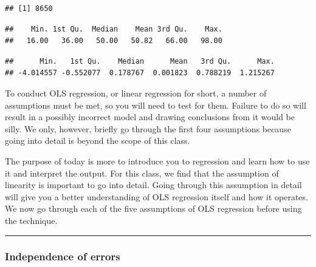 \documentclass[
]{book}
\newenvironment{Shaded}{\begin{snugshade}}{\end{snugshade}}
\newcommand{\CommentTok}[1]{\textcolor[rgb]{0.56,0.35,0.01}{\textit{#1}}}
\newcommand{\FunctionTok}[1]{\textcolor[rgb]{0.00,0.00,0.00}{#1}}
\newcommand{\NormalTok}[1]{#1}
\newcommand{\SpecialCharTok}[1]{\textcolor[rgb]{0.00,0.00,0.00}{#1}}
\begin{document}
\begin{verbatim}
## [1] 8650
\end{verbatim}

\begin{Shaded}
\end{Shaded}

\begin{verbatim}
##    Min. 1st Qu.  Median    Mean 3rd Qu.    Max. 
##   16.00   36.00   50.00   50.82   66.00   98.00
\end{verbatim}

\begin{Shaded}
\end{Shaded}

\begin{verbatim}
##      Min.   1st Qu.    Median      Mean   3rd Qu.      Max. 
## -4.014557 -0.552077  0.178767  0.001823  0.788219  1.215267
\end{verbatim}

To conduct OLS regression, or linear regression for short, a number of assumptions must be met, so you will need to test for them. Failure to do so will result in a possibly incorrect model and drawing conclusions from it would be silly. We only, however, briefly go through the first four assumptions because going into detail is beyond the scope of this class.

The purpose of today is more to introduce you to regression and learn how to use it and interpret the output. For this class, we find that the assumption of linearity is important to go into detail. Going through this assumption in detail will give you a better understanding of OLS regression itself and how it operates. We now go through each of the five assumptions of OLS regression before using the technique.

\begin{center}\rule{0.5\linewidth}{0.5pt}\end{center}

\hypertarget{independence-of-errors}{%
\subsubsection{Independence of errors}\label{independence-of-errors}}
\end{document}
